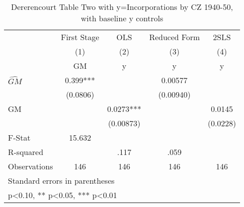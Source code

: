 \begin{table}[htbp]\centering
\def\sym#1{\ifmmode^{#1}\else\(^{#1}\)\fi}
\caption{Dererencourt Table Two with y=Incorporations by CZ 1940-50, with baseline y controls}
\begin{tabular}{l*{4}{c}}
\toprule
                    & First Stage   &         OLS   &Reduced Form   &        2SLS   \\
                    &\multicolumn{1}{c}{(1)}&\multicolumn{1}{c}{(2)}&\multicolumn{1}{c}{(3)}&\multicolumn{1}{c}{(4)}\\
                    &\multicolumn{1}{c}{GM}&\multicolumn{1}{c}{y}&\multicolumn{1}{c}{y}&\multicolumn{1}{c}{y}\\
\midrule
$\hat{GM}$          &       0.399***&               &     0.00577   &               \\
                    &    (0.0806)   &               &   (0.00940)   &               \\
\addlinespace
GM                  &               &      0.0273***&               &      0.0145   \\
                    &               &   (0.00873)   &               &    (0.0228)   \\
\midrule
F-Stat              &      15.632   &               &               &               \\
R-squared           &               &        .117   &        .059   &               \\
Observations        &         146   &         146   &         146   &         146   \\
\bottomrule
\multicolumn{5}{l}{\footnotesize Standard errors in parentheses}\\
\multicolumn{5}{l}{\footnotesize * p<0.10, ** p<0.05, *** p<0.01}\\
\end{tabular}
\end{table}

